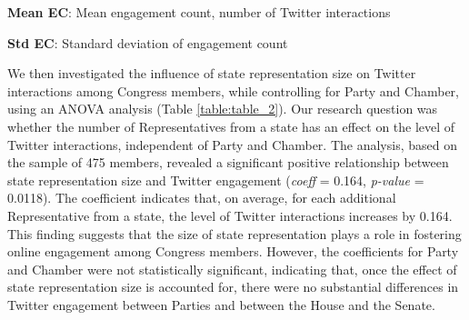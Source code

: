 \documentclass[11pt]{article}
\begin{document}
\begin{table}[h]
\caption{Mean and standard deviation of Twitter interactions of Congress members by Party and Chamber}
\label{table:table_1}
\begin{threeparttable}
\renewcommand{\TPTminimum}{\linewidth}
\begin{tablenotes}
\footnotesize
\item \textbf{Mean EC}: Mean engagement count, number of Twitter interactions
\item \textbf{Std EC}: Standard deviation of engagement count
\end{tablenotes}
\end{threeparttable}
\end{table}


We then investigated the influence of state representation size on Twitter interactions among Congress members, while controlling for Party and Chamber, using an ANOVA analysis (Table \ref{table:table_2}). Our research question was whether the number of Representatives from a state has an effect on the level of Twitter interactions, independent of Party and Chamber. The analysis, based on the sample of 475 members, revealed a significant positive relationship between state representation size and Twitter engagement (\textit{coeff} = 0.164, \textit{p-value} = 0.0118). The coefficient indicates that, on average, for each additional Representative from a state, the level of Twitter interactions increases by 0.164. This finding suggests that the size of state representation plays a role in fostering online engagement among Congress members. However, the coefficients for Party and Chamber were not statistically significant, indicating that, once the effect of state representation size is accounted for, there were no substantial differences in Twitter engagement between Parties and between the House and the Senate.
\end{document}
